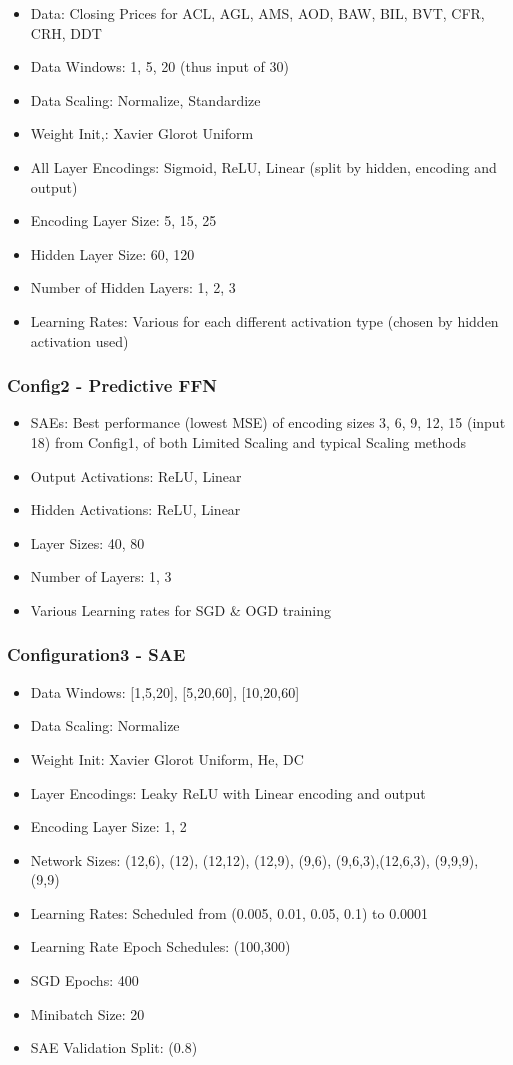 \documentclass[a4paper,latin]{paper}
\begin{document}
\begin{itemize}
	\item Data: Closing Prices for ACL, AGL, AMS, AOD, BAW, BIL, BVT, CFR, CRH, DDT
	\item Data Windows: 1, 5, 20 (thus input of 30)
	\item Data Scaling: Normalize, Standardize
	\item Weight Init,: Xavier Glorot Uniform
	\item All Layer Encodings: Sigmoid, ReLU, Linear (split by hidden, encoding and output)
	\item Encoding Layer Size: 5, 15, 25
	\item Hidden Layer Size: 60, 120
	\item Number of Hidden Layers: 1, 2, 3
	\item Learning Rates: Various for each different activation type (chosen by hidden activation used)
\end{itemize}

\subsubsection{Config2 - Predictive FFN}\label{config2}

\begin{itemize}
	\item SAEs: Best performance (lowest MSE) of encoding sizes 3, 6, 9, 12, 15 (input 18) from Config1, of both Limited Scaling and typical Scaling methods
	\item Output Activations: ReLU, Linear
	\item Hidden Activations: ReLU, Linear
	\item Layer Sizes: 40, 80
	\item Number of Layers: 1, 3
	\item Various Learning rates for SGD \& OGD training
\end{itemize}

\subsubsection{Configuration3 - SAE}\label{config3}
\begin{itemize}
	\item Data Windows: [1,5,20], [5,20,60], [10,20,60]
	\item Data Scaling: Normalize
	\item Weight Init: Xavier Glorot Uniform, He, DC
	\item Layer Encodings: Leaky ReLU with Linear encoding and output
	\item Encoding Layer Size: 1, 2
	\item Network Sizes: (12,6), (12), (12,12), (12,9), (9,6), (9,6,3),(12,6,3), (9,9,9), (9,9)
	\item Learning Rates: Scheduled from (0.005, 0.01, 0.05, 0.1) to 0.0001
	\item Learning Rate Epoch Schedules: (100,300)
	\item SGD Epochs: 400
	\item Minibatch Size: 20
	\item SAE Validation Split: (0.8)
\end{itemize}
	
\end{document}
